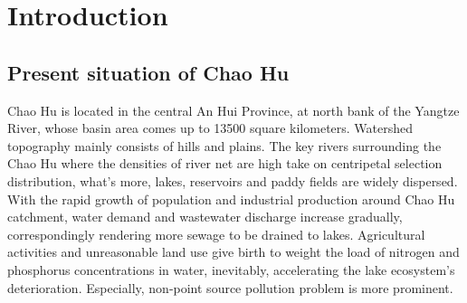 \documentclass[12pt,a4paper]{article}
\begin{document}



\newpage
\tableofcontents
\newpage

\section{Introduction}
\subsection{Present situation of Chao Hu}     
Chao Hu is located in the central An Hui Province, at north bank of the Yangtze River, whose basin area comes up to 13500 square kilometers. Watershed topography mainly consists of hills and plains. The key rivers surrounding the Chao Hu where the densities of river net are high take on centripetal selection distribution, what's more, lakes, reservoirs and paddy fields are widely dispersed. With the rapid growth of population and industrial production around Chao Hu catchment, water demand and wastewater discharge increase gradually, correspondingly rendering more sewage to be drained to lakes. Agricultural activities and unreasonable land use give birth to weight the load of nitrogen and phosphorus concentrations in water, inevitably, accelerating the lake ecosystem's deterioration. Especially, non-point source pollution problem is more prominent.\par
\end{document}
